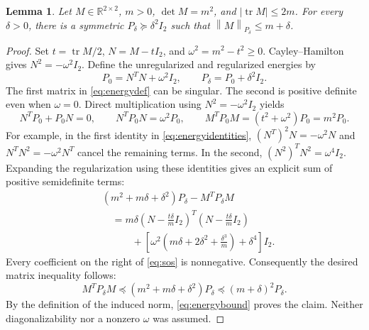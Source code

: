\documentclass[pdflatex,sn-mathphys-num]{sn-jnl}
\theoremstyle{thmstyleone}
\newtheorem{lemma}{Lemma}
\theoremstyle{thmstyletwo}
\newcommand{\R}{\mathbb R}
\newcommand{\tr}{\operatorname{tr}}
\newcommand{\norm}[1]{\left\lVert #1\right\rVert}
\begin{document}
\begin{lemma}\label{lem:energy}
Let $M\in\R^{2\times2}$, $m>0$, $\det M=m^2$, and
$|\tr M|\leq2m$. For every $\delta>0$, there is a symmetric
$P_\delta\succeq\delta^2I_2$ such that
$\norm{M}_{P_\delta}\leq m+\delta$.
\end{lemma}
\begin{proof}
Set $t=\tr M/2$, $N=M-tI_2$, and $\omega^2=m^2-t^2\geq0$.
Cayley--Hamilton gives $N^2=-\omega^2I_2$. Define the
unregularized and regularized energies by
\begin{equation}\label{eq:energydef}
 P_0=N^TN+\omega^2I_2,\qquad
 P_\delta=P_0+\delta^2I_2 .
\end{equation}
The first matrix in \eqref{eq:energydef} can be singular.
The second is positive definite even when $\omega=0$.
Direct multiplication using $N^2=-\omega^2I_2$ yields
\begin{equation}\label{eq:energyidentities}
 N^TP_0+P_0N=0,\qquad
 N^TP_0N=\omega^2P_0,\qquad
 M^TP_0M=(t^2+\omega^2)P_0=m^2P_0 .
\end{equation}
For example, in the first identity in \eqref{eq:energyidentities},
$(N^T)^2N=-\omega^2N$ and $N^TN^2=-\omega^2N^T$ cancel the
remaining terms. In the second, $(N^2)^TN^2=\omega^4I_2$.
Expanding the regularization using these identities gives an
explicit sum of positive semidefinite terms:
\begin{equation}\label{eq:sos}
\begin{split}
 &(m^2+m\delta+\delta^2)P_\delta-M^TP_\delta M\\
 &\quad=m\delta
       \left(N-\frac{t\delta}{m}I_2\right)^T
       \left(N-\frac{t\delta}{m}I_2\right)\\
 &\qquad\quad+
   \left[\omega^2\left(m\delta+2\delta^2+\frac{\delta^3}{m}\right)
                 +\delta^4\right]I_2 .
\end{split}
\end{equation}
Every coefficient on the right of \eqref{eq:sos} is nonnegative.
Consequently the desired matrix inequality follows:
\begin{equation}\label{eq:energybound}
 M^TP_\delta M\preceq(m^2+m\delta+\delta^2)P_\delta
                  \preceq(m+\delta)^2P_\delta .
\end{equation}
By the definition of the induced norm, \eqref{eq:energybound}
proves the claim. Neither diagonalizability nor a nonzero
$\omega$ was assumed.
\end{proof}
\end{document}
